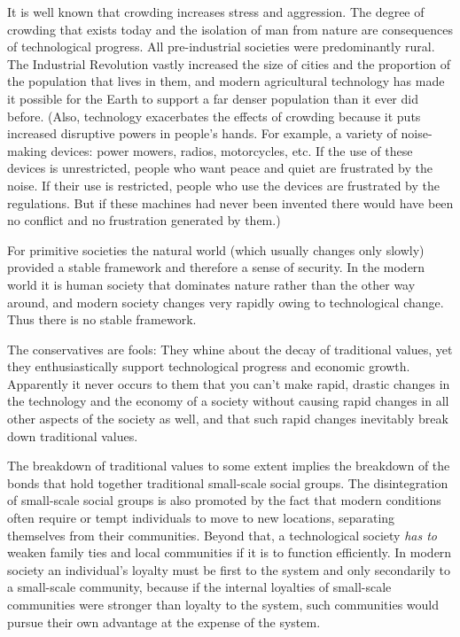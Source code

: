  It is well known that crowding increases stress and aggression. The degree of crowding that exists today and the isolation of man from nature are consequences of technological progress. All pre-industrial societies were predominantly rural. The Industrial Revolution vastly increased the size of cities and the proportion of the population that lives in them, and modern agricultural technology has made it possible for the Earth to support a far denser population than it ever did before. (Also, technology exacerbates the effects of crowding because it puts increased disruptive powers in people’s hands. For example, a variety of noise- making devices: power mowers, radios, motorcycles, etc. If the use of these devices is unrestricted, people who want peace and quiet are frustrated by the noise. If their use is restricted, people who use the devices are frustrated by the regulations. But if these machines had never been invented there would have been no conflict and no frustration generated by them.)

 For primitive societies the natural world (which usually changes only slowly) provided a stable framework and therefore a sense of security. In the modern world it is human society that dominates nature rather than the other way around, and modern society changes very rapidly owing to technological change. Thus there is no stable framework.

 The conservatives are fools: They whine about the decay of traditional values, yet they enthusiastically support technological progress and economic growth. Apparently it never occurs to them that you can’t make rapid, drastic changes in the technology and the economy of a society without causing rapid changes in all other aspects of the society as well, and that such rapid changes inevitably break down traditional values.

 The breakdown of traditional values to some extent implies the breakdown of the bonds that hold together traditional small-scale social groups. The disintegration of small-scale social groups is also promoted by the fact that modern conditions often require or tempt individuals to move to new locations, separating themselves from their communities. Beyond that, a technological society {\em has to} weaken family ties and local communities if it is to function efficiently. In modern society an individual’s loyalty must be first to the system and only secondarily to a small-scale community, because if the internal loyalties of small-scale communities were stronger than loyalty to the system, such communities would pursue their own advantage at the expense of the system.

